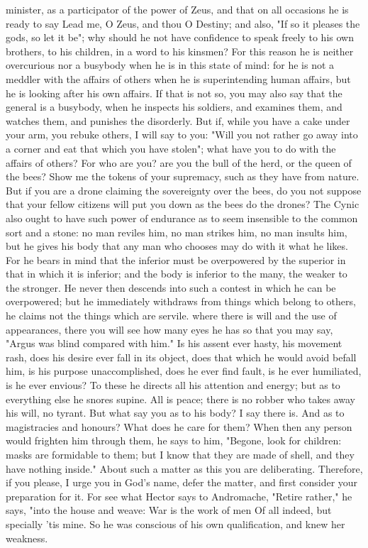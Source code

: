 \documentclass[a4paper]{article}
\begin{document}
minister, as a participator of the power of Zeus, and that on all occasions he
is ready to say
       Lead me, O Zeus, and thou O Destiny;
and also, "If so it pleases the gods, so let it be"; why should he not have
confidence to speak freely to his own brothers, to his children, in a word to
his kinsmen? For this reason he is neither overcurious nor a busybody when he
is in this state of mind: for he is not a meddler with the affairs of others
when he is superintending human affairs, but he is looking after his own
affairs. If that is not so, you may also say that the general is a busybody,
when he inspects his soldiers, and examines them, and watches them, and
punishes the disorderly. But if, while you have a cake under your arm, you
rebuke others, I will say to you: "Will you not rather go away into a corner
and eat that which you have stolen"; what have you to do with the affairs of
others? For who are you? are you the bull of the herd, or the queen of the
bees? Show me the tokens of your supremacy, such as they have from nature. But
if you are a drone claiming the sovereignty over the bees, do you not suppose
that your fellow citizens will put you down as the bees do the drones?
    The Cynic also ought to have such power of endurance as to seem insensible
to the common sort and a stone: no man reviles him, no man strikes him, no man
insults him, but he gives his body that any man who chooses may do with it what
he likes. For he bears in mind that the inferior must be overpowered by the
superior in that in which it is inferior; and the body is inferior to the many,
the weaker to the stronger. He never then descends into such a contest in which
he can be overpowered; but he immediately withdraws from things which belong to
others, he claims not the things which are servile. where there is will and the
use of appearances, there you will see how many eyes he has so that you may
say, "Argus was blind compared with him." Is his assent ever hasty, his
movement rash, does his desire ever fall in its object, does that which he
would avoid befall him, is his purpose unaccomplished, does he ever find fault,
is he ever humiliated, is he ever envious? To these he directs all his
attention and energy; but as to everything else he snores supine. All is peace;
there is no robber who takes away his will, no tyrant. But what say you as to
his body? I say there is. And as to magistracies and honours? What does he care
for them? When then any person would frighten him through them, he says to him,
"Begone, look for children: masks are formidable to them; but I know that they
are made of shell, and they have nothing inside."
    About such a matter as this you are deliberating. Therefore, if you please,
I urge you in God's name, defer the matter, and first consider your preparation
for it. For see what Hector says to Andromache, "Retire rather," he says, "into
the house and weave:
       War is the work of men
       Of all indeed, but specially 'tis mine.
So he was conscious of his own qualification, and knew her weakness.
\end{document}
